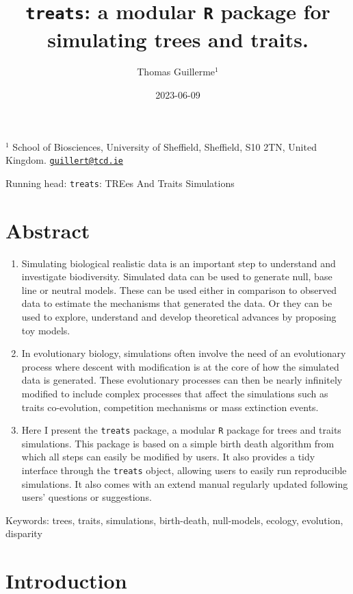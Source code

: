 \documentclass[
]{article}
\title{\texttt{treats}: a modular \texttt{R} package for simulating
trees and traits.}
\author{Thomas Guillerme\(^1\)}
\date{2023-06-09}
\begin{document}
\maketitle

\(^1\) School of Biosciences, University of Sheffield, Sheffield, S10
2TN, United Kingdom.
\href{mailto:guillert@tcd.ie}{\nolinkurl{guillert@tcd.ie}}

Running head: \texttt{treats}: TREes And Traits Simulations

\hypertarget{abstract}{%
\section{Abstract}\label{abstract}}

\begin{enumerate}
\def\labelenumi{\arabic{enumi}.}
\item
  Simulating biological realistic data is an important step to
  understand and investigate biodiversity. Simulated data can be used to
  generate null, base line or neutral models. These can be used either
  in comparison to observed data to estimate the mechanisms that
  generated the data. Or they can be used to explore, understand and
  develop theoretical advances by proposing toy models.
\item
  In evolutionary biology, simulations often involve the need of an
  evolutionary process where descent with modification is at the core of
  how the simulated data is generated. These evolutionary processes can
  then be nearly infinitely modified to include complex processes that
  affect the simulations such as traits co-evolution, competition
  mechanisms or mass extinction events.
\item
  Here I present the \texttt{treats} package, a modular \texttt{R}
  package for trees and traits simulations. This package is based on a
  simple birth death algorithm from which all steps can easily be
  modified by users. It also provides a tidy interface through the
  \texttt{treats} object, allowing users to easily run reproducible
  simulations. It also comes with an extend manual regularly updated
  following users' questions or suggestions.
\end{enumerate}

Keywords: trees, traits, simulations, birth-death, null-models, ecology,
evolution, disparity

\hypertarget{introduction}{%
\section{Introduction}\label{introduction}}
\end{document}
